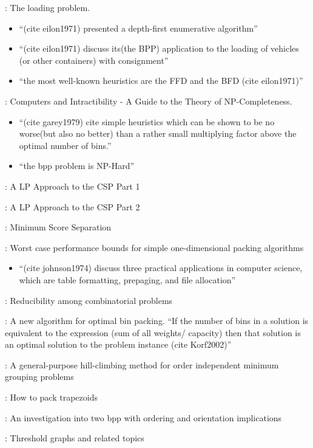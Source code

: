 \documentclass[oribibl]{llncs}
\begin{document}
\cite{eilon1971}: The loading problem. 
\begin{itemize}
	\item ``(cite eilon1971) presented a depth-first enumerative algorithm''
	\item ``(cite eilon1971) discuss its(the BPP) application to the loading of vehicles (or other containers) with consignment'' 
	\item ``the most well-known heuristics are the FFD and the BFD (cite eilon1971)''
\end{itemize}
\cite{garey1979}: Computers and Intractibility - A Guide to the Theory of NP-Completeness. 
\begin{itemize}
	\item ``(cite garey1979) cite simple heuristics which can be shown to be no
	worse(but also no better) than a rather small multiplying factor above the optimal number of bins.''
	\item ``the bpp problem is NP-Hard''
\end{itemize}

\cite{gilmore1961}: A LP Approach to the CSP Part 1

\cite{gilmore1963}: A LP Approach to the CSP Part 2

\cite{goulimis2004}: Minimum Score Separation

\cite{johnson1974}: Worst case performance bounds for simple one-dimensional packing algorithms
\begin{itemize}
	\item ``(cite johnson1974) discuss three practical applications in computer science, which are table formatting, prepaging, and file allocation''
\end{itemize}

\cite{karp1972}: Reducibility among combinatorial problems

\cite{korf2002}: A new algorithm for optimal bin packing. ``If the number of bins in a solution is equivalent to the expression (sum of all weights/ capacity) then that solution is an optimal solution to the problem instance (cite Korf2002)'' 

\cite{lewis2009}: A general-purpose hill-climbing method for order independent minimum grouping problems

\cite{lewis2017}: How to pack trapezoids

\cite{lewis2011}: An investigation into two bpp with ordering and orientation implications

\cite{mahadev1995}: Threshold graphs and related topics
\end{document}
